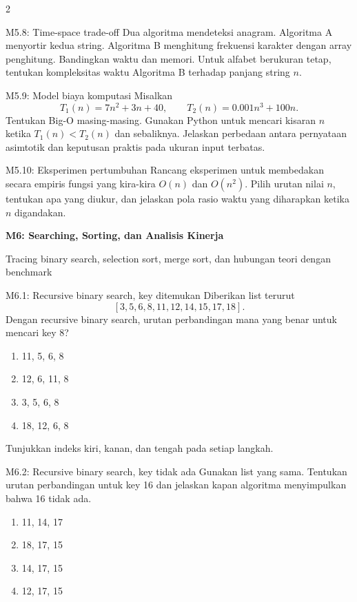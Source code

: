 \documentclass[9pt,a4paper]{article}
\newcommand{\bab}[2]{%
  \vspace{2pt}
  {\color{iteraBlue}\Large\bfseries #1}\par
  {\color{darkgray}\small #2}\par\vspace{3pt}
}
\begin{document}
\begin{multicols}{2}
\begin{qbox}[L4]{M5.8: Time-space trade-off}
Dua algoritma mendeteksi anagram. Algoritma A menyortir kedua string. Algoritma B menghitung frekuensi karakter dengan array penghitung. Bandingkan waktu dan memori. Untuk alfabet berukuran tetap, tentukan kompleksitas waktu Algoritma B terhadap panjang string $n$.
\end{qbox}

\begin{qbox}[L4]{M5.9: Model biaya komputasi}
Misalkan
\[
T_1(n)=7n^2+3n+40,\qquad T_2(n)=0.001n^3+100n.
\]
Tentukan Big-O masing-masing. Gunakan Python untuk mencari kisaran $n$ ketika $T_1(n)<T_2(n)$ dan sebaliknya. Jelaskan perbedaan antara pernyataan asimtotik dan keputusan praktis pada ukuran input terbatas.
\end{qbox}

\begin{qbox}[L4]{M5.10: Eksperimen pertumbuhan}
Rancang eksperimen untuk membedakan secara empiris fungsi yang kira-kira $O(n)$ dan $O(n^2)$. Pilih urutan nilai $n$, tentukan apa yang diukur, dan jelaskan pola rasio waktu yang diharapkan ketika $n$ digandakan.
\end{qbox}

\bab{M6: Searching, Sorting, dan Analisis Kinerja}{Tracing binary search, selection sort, merge sort, dan hubungan teori dengan benchmark}

\begin{qbox}[L2]{M6.1: Recursive binary search, key ditemukan}
Diberikan list terurut
\[
[3,5,6,8,11,12,14,15,17,18].
\]
Dengan recursive binary search, urutan perbandingan mana yang benar untuk mencari key 8?
\begin{enumerate}
\item 11, 5, 6, 8
\item 12, 6, 11, 8
\item 3, 5, 6, 8
\item 18, 12, 6, 8
\end{enumerate}
Tunjukkan indeks kiri, kanan, dan tengah pada setiap langkah.
\end{qbox}

\begin{qbox}[L2]{M6.2: Recursive binary search, key tidak ada}
Gunakan list yang sama. Tentukan urutan perbandingan untuk key 16 dan jelaskan kapan algoritma menyimpulkan bahwa 16 tidak ada.
\begin{enumerate}
\item 11, 14, 17
\item 18, 17, 15
\item 14, 17, 15
\item 12, 17, 15
\end{enumerate}
\end{qbox}


\end{multicols}
\end{document}
